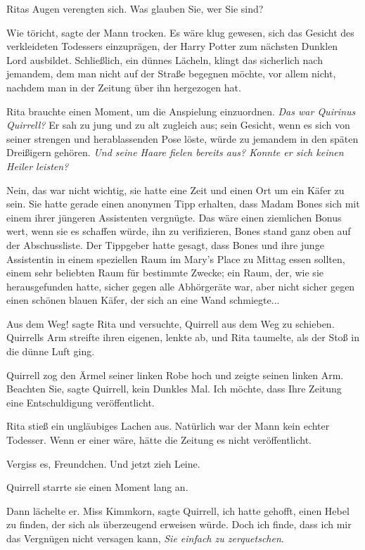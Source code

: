 Ritas Augen verengten sich. \glqq Was glauben Sie, wer Sie sind?\grqq{}

\glqq{}Wie töricht\grqq{}, sagte der Mann trocken. \glqq{}Es wäre klug gewesen,
sich das Gesicht des verkleideten Todessers einzuprägen, der Harry Potter zum
nächsten Dunklen Lord ausbildet. Schließlich\grqq{}, ein dünnes Lächeln, \glqq{}
klingt das sicherlich nach jemandem, dem man nicht auf der Straße begegnen
möchte, vor allem nicht, nachdem man in der Zeitung über ihn hergezogen
hat.\grqq{}

Rita brauchte einen Moment, um die Anspielung einzuordnen. \emph{Das war
Quirinus Quirrell?} Er sah zu jung und zu alt zugleich aus; sein Gesicht, wenn
es sich von seiner strengen und herablassenden Pose löste, würde zu jemandem in
den späten Dreißigern gehören. \emph{Und seine Haare fielen bereits aus? Konnte
er sich keinen Heiler leisten?}


Nein, das war nicht wichtig, sie hatte eine Zeit und einen Ort um ein Käfer zu
sein. Sie hatte gerade einen anonymen Tipp erhalten, dass Madam Bones sich mit
einem ihrer jüngeren Assistenten vergnügte. Das wäre einen ziemlichen Bonus
wert, wenn sie es schaffen würde, ihn zu verifizieren, Bones stand ganz oben auf
der Abschussliste. Der Tippgeber hatte gesagt, dass Bones und ihre junge
Assistentin in einem speziellen Raum im Mary's Place zu Mittag essen sollten,
einem sehr beliebten Raum für bestimmte Zwecke; ein Raum, der, wie sie
herausgefunden hatte, sicher gegen alle Abhörgeräte war, aber nicht sicher gegen
einen schönen blauen Käfer, der sich an eine Wand schmiegte...

\glqq{}Aus dem Weg!\grqq{} sagte Rita und versuchte, Quirrell aus dem Weg zu
schieben. Quirrells Arm streifte ihren eigenen, lenkte ab, und Rita taumelte,
als der Stoß in die dünne Luft ging.

Quirrell zog den Ärmel seiner linken Robe hoch und zeigte seinen linken Arm.
\glqq{}Beachten Sie\grqq{}, sagte Quirrell, \glqq{}kein Dunkles Mal. Ich möchte,
dass Ihre Zeitung eine Entschuldigung veröffentlicht.\grqq{}

Rita stieß ein ungläubiges Lachen aus. Natürlich war der Mann kein echter
Todesser. Wenn er einer wäre, hätte die Zeitung es nicht veröffentlicht.

\glqq{}Vergiss es, Freundchen. Und jetzt zieh Leine.\grqq{}

Quirrell starrte sie einen Moment lang an.

Dann lächelte er. \glqq{}Miss Kimmkorn\grqq{}, sagte Quirrell, \glqq{}ich hatte
gehofft, einen Hebel zu finden, der sich als überzeugend erweisen würde. Doch
ich finde, dass ich mir das Vergnügen nicht versagen kann, \emph{Sie einfach zu
zerquetschen}.\grqq{}

